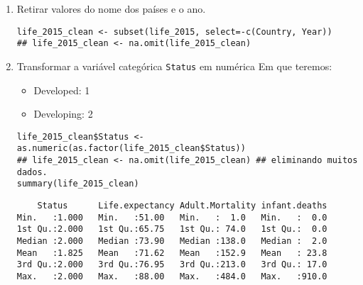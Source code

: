 \documentclass[11pt]{article}
\begin{document}
\begin{enumerate}
\item Retirar valores do nome dos países e o ano.
\label{sec:orgb720e33}
\begin{verbatim}
life_2015_clean <- subset(life_2015, select=-c(Country, Year))
## life_2015_clean <- na.omit(life_2015_clean)
\end{verbatim}

\item Transformar a variável categórica \texttt{Status} em numérica
\label{sec:org989386d}
Em que teremos:
\begin{itemize}
\item Developed: 1
\item Developing: 2
\end{itemize}

\begin{verbatim}
life_2015_clean$Status <- as.numeric(as.factor(life_2015_clean$Status))
## life_2015_clean <- na.omit(life_2015_clean) ## eliminando muitos dados.
summary(life_2015_clean)
\end{verbatim}

\begin{verbatim}
    Status      Life.expectancy Adult.Mortality infant.deaths  
Min.   :1.000   Min.   :51.00   Min.   :  1.0   Min.   :  0.0  
1st Qu.:2.000   1st Qu.:65.75   1st Qu.: 74.0   1st Qu.:  0.0  
Median :2.000   Median :73.90   Median :138.0   Median :  2.0  
Mean   :1.825   Mean   :71.62   Mean   :152.9   Mean   : 23.8  
3rd Qu.:2.000   3rd Qu.:76.95   3rd Qu.:213.0   3rd Qu.: 17.0  
Max.   :2.000   Max.   :88.00   Max.   :484.0   Max.   :910.0  


\end{verbatim}
\end{enumerate}
\end{document}
